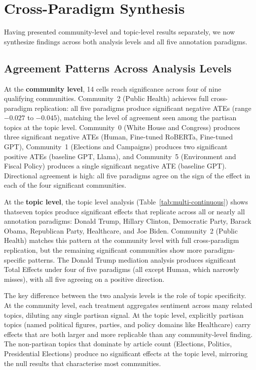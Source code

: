 \section{Cross-Paradigm Synthesis}
\label{sec:cross-paradigm-synthesis}

Having presented community-level and topic-level results separately, we now synthesize findings across both analysis levels and all five annotation paradigms.

\subsection{Agreement Patterns Across Analysis Levels}

At the \textbf{community level}, 14 cells reach significance across four of nine qualifying communities. Community~2 (Public Health) achieves full cross-paradigm replication: all five paradigms produce significant negative ATEs (range $-0.027$ to $-0.045$), matching the level of agreement seen among the partisan topics at the topic level. Community~0 (White House and Congress) produces three significant negative ATEs (Human, Fine-tuned RoBERTa, Fine-tuned GPT), Community~1 (Elections and Campaigns) produces two significant positive ATEs (baseline GPT, Llama), and Community~5 (Environment and Fiscal Policy) produces a single significant negative ATE (baseline GPT). Directional agreement is high: all five paradigms agree on the sign of the effect in each of the four significant communities.

At the \textbf{topic level}, the topic level analysis (Table~\ref{tab:multi-continuous}) shows thatseven topics produce significant effects that replicate across all or nearly all annotation paradigms: Donald Trump, Hillary Clinton, Democratic Party, Barack Obama, Republican Party, Healthcare, and Joe Biden. Community~2 (Public Health) matches this pattern at the community level with full cross-paradigm replication, but the remaining significant communities show more paradigm-specific patterns. The Donald Trump mediation analysis produces significant Total Effects under four of five paradigms (all except Human, which narrowly misses), with all five agreeing on a positive direction.

The key difference between the two analysis levels is the role of topic specificity. At the community level, each treatment aggregates sentiment across many related topics, diluting any single partisan signal. At the topic level, explicitly partisan topics (named political figures, parties, and policy domains like Healthcare) carry effects that are both larger and more replicable than any community-level finding. The non-partisan topics that dominate by article count (Elections, Politics, Presidential Elections) produce no significant effects at the topic level, mirroring the null results that characterise most communities.

